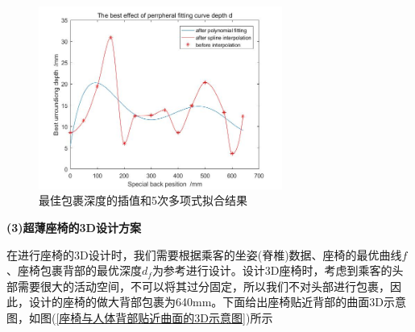             \begin{figure}[H]
            \centering
            \includegraphics[width=8cm]{images/optimal_parcel_depth_interpolation_and_5polynomail.jpg}
            \caption{最佳包裹深度的插值和5次多项式拟合结果}
            \label{最佳包裹深度的插值和5次多项式拟合结果}
            \end{figure}
            \par
            \textbf{(3)超薄座椅的3D设计方案}
            \par
            在进行座椅的3D设计时，我们需要根据乘客的坐姿(脊椎)数据、座椅的最优曲线$f$、座椅包裹背部的最优深度$d_f$为参考进行设计。设计3D座椅时，考虑到乘客的头部需要很大的活动空间，不可以将其过分固定，所以我们不对头部进行包裹，因此，设计的座椅的做大背部包裹为640mm。下面给出座椅贴近背部的曲面3D示意图，如图(\ref{座椅与人体背部贴近曲面的3D示意图})所示
